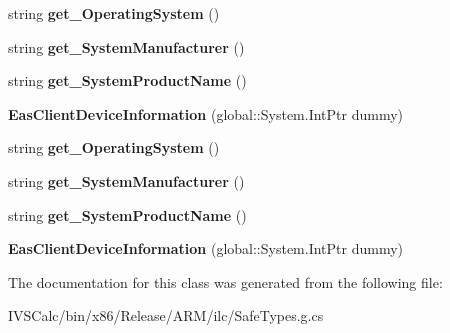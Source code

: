 \begin{DoxyCompactItemize}
string {\bfseries get\+\_\+\+Operating\+System} ()
\item 
\mbox{\label{class_windows_1_1_security_1_1_exchange_active_sync_provisioning_1_1_eas_client_device_information_a2d3a255b5b41c34c0f7542318e5f207d}} 
string {\bfseries get\+\_\+\+System\+Manufacturer} ()
\item 
\mbox{\label{class_windows_1_1_security_1_1_exchange_active_sync_provisioning_1_1_eas_client_device_information_a3e507a167d417f10d65e56251aec5982}} 
string {\bfseries get\+\_\+\+System\+Product\+Name} ()
\item 
\mbox{\label{class_windows_1_1_security_1_1_exchange_active_sync_provisioning_1_1_eas_client_device_information_aef050ce52c8b7b0149fff7b913abb470}} 
{\bfseries Eas\+Client\+Device\+Information} (global\+::\+System.\+Int\+Ptr dummy)
\item 
\mbox{\label{class_windows_1_1_security_1_1_exchange_active_sync_provisioning_1_1_eas_client_device_information_ab1b82cba32df656ceecc42a7fc660d7d}} 
string {\bfseries get\+\_\+\+Operating\+System} ()
\item 
\mbox{\label{class_windows_1_1_security_1_1_exchange_active_sync_provisioning_1_1_eas_client_device_information_a2d3a255b5b41c34c0f7542318e5f207d}} 
string {\bfseries get\+\_\+\+System\+Manufacturer} ()
\item 
\mbox{\label{class_windows_1_1_security_1_1_exchange_active_sync_provisioning_1_1_eas_client_device_information_a3e507a167d417f10d65e56251aec5982}} 
string {\bfseries get\+\_\+\+System\+Product\+Name} ()
\item 
\mbox{\label{class_windows_1_1_security_1_1_exchange_active_sync_provisioning_1_1_eas_client_device_information_aef050ce52c8b7b0149fff7b913abb470}} 
{\bfseries Eas\+Client\+Device\+Information} (global\+::\+System.\+Int\+Ptr dummy)
\end{DoxyCompactItemize}


The documentation for this class was generated from the following file\+:\begin{DoxyCompactItemize}
\item 
I\+V\+S\+Calc/bin/x86/\+Release/\+A\+R\+M/ilc/Safe\+Types.\+g.\+cs\end{DoxyCompactItemize}
